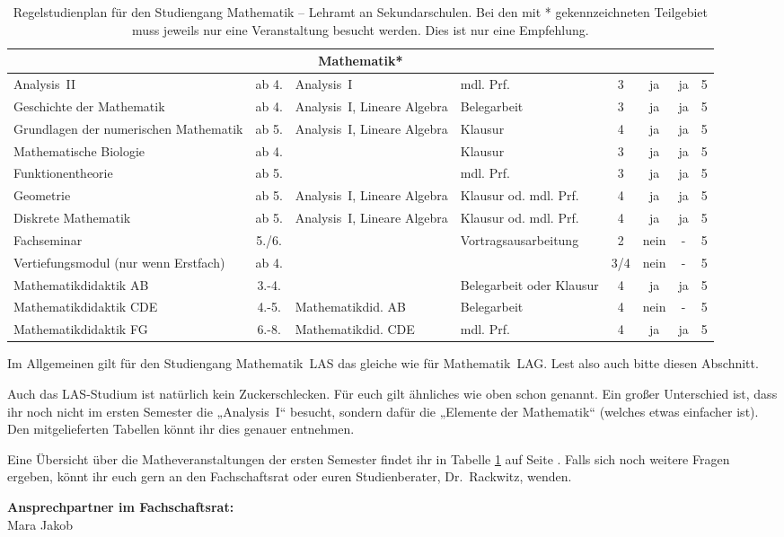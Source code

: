 \begin{table}[tbp]
\begin{footnotesize}
\begin{tabularx}{\textwidth}{|@{~}X@{~}|@{~}c@{~}|@{~}X@{~}|@{~}X@{~}|@{~}c@{~}|@{~}c@{~}|@{~}c@{~}|@{~}c@{~}|}
        \multicolumn{8}{|c|}{Mathematik*}\\\hline
        Analysis~II & ab 4. & Analysis~I & mdl. Prf. & 3 & ja & ja & 5\\\hline
        Geschichte der Mathematik & ab 4. & Analysis~I, Lineare Algebra & Belegarbeit & 3 & ja & ja & 5\\\hline
        Grundlagen der numerischen Mathematik & ab 5. & Analysis~I, Lineare Algebra & Klausur & 4 & ja & ja & 5\\\hline
        Mathematische Biologie & ab 4. & & Klausur & 3 & ja & ja & 5\\\hline
        Funktionentheorie & ab 5. & & mdl. Prf. & 3 & ja & ja & 5\\\hline
        Geometrie & ab 5. & Analysis~I, Lineare Algebra & Klausur od. mdl. Prf. & 4 & ja & ja & 5\\\hline
        Diskrete Mathematik & ab 5. & Analysis~I, Lineare Algebra & Klausur od. mdl. Prf. & 4 & ja & ja & 5\\\hline\hline

        Fachseminar & 5./6. & & Vortrags\-ausarbeitung & 2 & nein & - & 5\\\hline
        Ver\-tiefungs\-modul (nur wenn Erst\-fach)&ab 4.&&&3/4&nein&-&5\\\hline
        Mathe\-matik\-didaktik AB&3.-4.&&Beleg\-arbeit oder Klausur&4&ja&ja&5\\\hline
        Mathe\-matik\-didaktik CDE&4.-5.&Mathe\-matikdid. AB&Beleg\-arbeit&4&nein&-&5\\\hline
        Mathe\-matik\-didaktik FG&6.-8.&Mathe\-matikdid. CDE&mdl. Prf.&4&ja&ja&5\\\hline
    \end{tabularx}
    \end{footnotesize}
    \caption{\label{plan-las}Regelstudienplan für den Studiengang Mathematik -- Lehramt an Sekundarschulen. Bei den mit * gekennzeichneten Teilgebiet muss jeweils nur eine Veranstaltung besucht werden. Dies ist nur eine Empfehlung.}
\end{table}

Im Allgemeinen gilt für den Studiengang Mathematik~LAS das gleiche wie für Mathematik~LAG.
Lest also auch bitte diesen Abschnitt.

Auch das LAS-Studium ist natürlich kein Zuckerschlecken.
Für euch gilt ähnliches wie oben schon genannt.
Ein großer Unterschied ist, dass ihr noch nicht im ersten Semester die „Analysis~I“ besucht, sondern dafür die „Elemente der Mathematik“ (welches etwas einfacher ist).
Den mitgelieferten Tabellen könnt ihr dies genauer entnehmen.

Eine Übersicht über die Matheveranstaltungen der ersten Semester findet ihr in Tabelle \ref{plan-las} auf Seite \pageref{plan-las}.
Falls sich noch weitere Fragen ergeben, könnt ihr euch gern an den Fachschaftsrat oder euren Studienberater, Dr.~Rackwitz, wenden.

\textbf{Ansprechpartner im Fachschaftsrat:}\\
Mara Jakob\\


